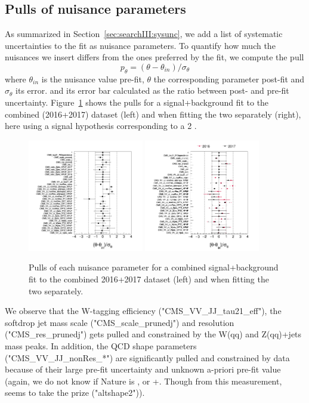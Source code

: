 \subsection{Pulls of nuisance parameters}
\label{sec:searchIII:pulls}
As summarized in Section~\ref{sec:searchIII:sysunc}, we add a list of systematic uncertainties to the fit as nuisance parameters.
To quantify how much the nuisances we insert differs from the ones preferred by the fit, we compute the pull
\begin{equation}
p_{\theta} = (\theta - \theta_{in})/\sigma_\theta
\end{equation}
where $\theta_{in}$ is the nuisance value pre-fit, $\theta$ the corresponding parameter post-fit and $\sigma_\theta$ its error.
and its error bar calculated as the ratio between post- and pre-fit uncertainty.
Figure~\ref{fig:searchIII:pullsCombo1617} shows the pulls for a signal+background fit to the combined (2016+2017) dataset (left) and when fitting the two separately (right), here using a signal hypothesis corresponding to a 2 \TeV \BulkG.
\begin{figure}[h!]
\centering
\includegraphics[width=0.45\textwidth]{figures/analysis/search3/AN-17-303/postfitchecks/pulls_Combo1617.png}
\includegraphics[width=0.45\textwidth]{figures/analysis/search3/AN-17-303/postfitchecks/pulls_16_vs_17.png}
\caption{Pulls of each nuisance parameter for a combined signal+background fit to the combined 2016+2017 dataset (left) and when fitting the two separately.}
\label{fig:searchIII:pullsCombo1617}
\end{figure}
We observe that the W-tagging efficiency ("CMS\_VV\_JJ\_tau21\_eff"), the softdrop jet mass scale ("CMS\_scale\_prunedj") and resolution ("CMS\_res\_prunedj") gets pulled and constrained by the W(qq) and Z(qq)+jets mass peaks. In addition, the QCD shape parameters ("CMS\_VV\_JJ\_nonRes\_*") are significantly pulled and constrained by data because of their large pre-fit uncertainty and unknown a-priori pre-fit value (again, we do not know if Nature is , \HERWIG{++} or \MADGRAPH{}+. Though from this measurement, \HERWIG{++} seems to take the prize ("altshape2")).

